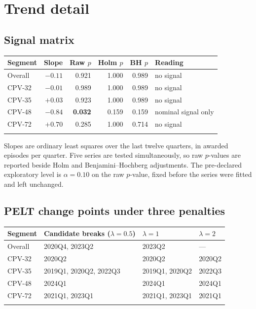 \section{Trend detail}
\label{app:trend}

\subsection*{Signal matrix}

\begin{longtable}[]{@{}lrrrrl@{}}
\toprule\noalign{}
Segment & Slope & Raw $p$ & Holm $p$ & BH $p$ & Reading \\
\midrule\noalign{}
\endhead
Overall & $-0.11$ & 0.921 & 1.000 & 0.989 & no signal \\
CPV-32 & $-0.01$ & 0.989 & 1.000 & 0.989 & no signal \\
CPV-35 & $+0.03$ & 0.923 & 1.000 & 0.989 & no signal \\
CPV-48 & $-0.84$ & \textbf{0.032} & 0.159 & 0.159 & nominal signal only \\
CPV-72 & $+0.70$ & 0.285 & 1.000 & 0.714 & no signal \\
\bottomrule\noalign{}
\end{longtable}

Slopes are ordinary least squares over the last twelve quarters, in awarded episodes per quarter. Five series
are tested simultaneously, so raw $p$-values are reported beside Holm and Benjamini--Hochberg adjustments. The
pre-declared exploratory level is $\alpha = 0.10$ on the raw $p$-value, fixed before the series were fitted
and left unchanged.

\subsection*{PELT change points under three penalties}

\begin{longtable}[]{@{}llll@{}}
\toprule\noalign{}
Segment & Candidate breaks ($\lambda = 0.5$) & $\lambda = 1$ & $\lambda = 2$ \\
\midrule\noalign{}
\endhead
Overall & 2020Q4, 2023Q2 & 2023Q2 & --- \\
CPV-32 & 2020Q2 & 2020Q2 & 2020Q2 \\
CPV-35 & 2019Q1, 2020Q2, 2022Q3 & 2019Q1, 2020Q2 & 2022Q3 \\
CPV-48 & 2024Q1 & 2024Q1 & 2024Q1 \\
CPV-72 & 2021Q1, 2023Q1 & 2021Q1, 2023Q1 & 2021Q1 \\
\bottomrule\noalign{}
\end{longtable}

